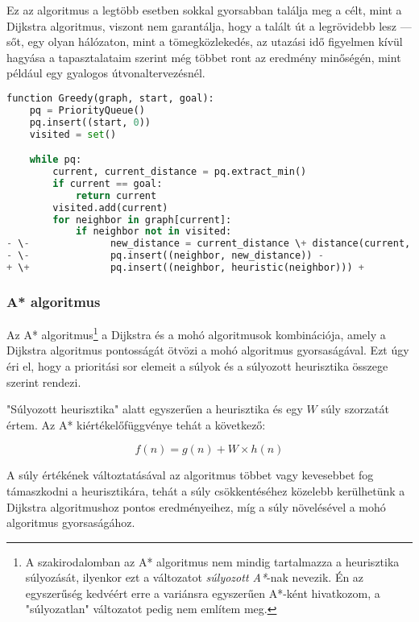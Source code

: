 Ez az algoritmus a legtöbb esetben sokkal gyorsabban találja meg a célt, mint a Dijkstra algoritmus, viszont nem garantálja, hogy a talált út a legrövidebb lesz --- sőt, egy olyan hálózaton, mint a tömegközlekedés, az utazási idő figyelmen kívül hagyása a tapasztalataim szerint még többet ront az eredmény minőségén, mint például egy gyalogos útvonaltervezésnél.

\begin{lstlisting}[language={Python}, style=gitdiff]
function Greedy(graph, start, goal):
    pq = PriorityQueue()
    pq.insert((start, 0))
    visited = set()

    while pq:
        current, current_distance = pq.extract_min()
        if current == goal:
            return current
        visited.add(current)
        for neighbor in graph[current]:
            if neighbor not in visited:
- \-              new_distance = current_distance \+ distance(current, neighbor) -
- \-              pq.insert((neighbor, new_distance)) -
+ \+              pq.insert((neighbor, heuristic(neighbor))) +
\end{lstlisting}

\subsubsection{A* algoritmus}

Az A* algoritmus\footnote{A szakirodalomban az A* algoritmus nem mindig tartalmazza a heurisztika súlyozását, ilyenkor ezt a változatot \textit{súlyozott A*}-nak nevezik\cite{russell2020artificial}. Én az egyszerűség kedvéért erre a variánsra egyszerűen A*-ként hivatkozom, a "súlyozatlan" változatot pedig nem említem meg.} a Dijkstra és a mohó algoritmusok kombinációja, amely a Dijkstra algoritmus pontosságát ötvözi a mohó algoritmus gyorsaságával. Ezt úgy éri el, hogy a prioritási sor elemeit a súlyok és a súlyozott heurisztika összege szerint rendezi.

"Súlyozott heurisztika" alatt egyszerűen a heurisztika és egy $W$ súly szorzatát értem. Az A* kiértékelőfüggvénye tehát a következő\cite{russell2020artificial}:

$$f(n) = g(n) + W \times h(n)$$

A súly értékének változtatásával az algoritmus többet vagy kevesebbet fog támaszkodni a heurisztikára, tehát a súly csökkentéséhez közelebb kerülhetünk a Dijkstra algoritmushoz pontos eredményeihez, míg a súly növelésével a mohó algoritmus gyorsaságához.

